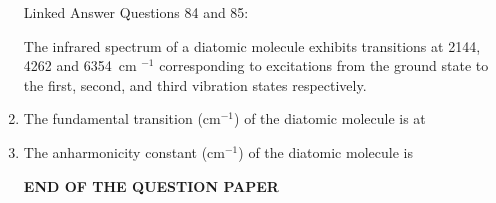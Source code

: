 \documentclass[12pt]{article}
\begin{document}
\begin{enumerate}
    

Linked Answer Questions 84 and 85:

The infrared spectrum of a diatomic molecule exhibits transitions at 2144, 4262 and 6354~cm $^{-1}$ 
corresponding to excitations from the ground state to the first, second, and third vibration states respectively.

\item  The fundamental transition (cm$^{-1}$) of the diatomic molecule is at
\begin{enumerate}
   \hfill{}
\end{enumerate}

\item  The anharmonicity constant (cm$^{-1}$) of the diatomic molecule is
\begin{enumerate}
   \hfill{}
\end{enumerate}

\begin{center}
\textbf{END OF THE QUESTION PAPER}
\end{center}

\end{enumerate}
\end{document}
